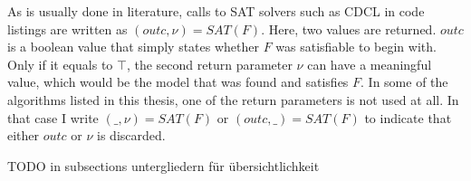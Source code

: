 
As is usually done in literature, calls to SAT solvers such as CDCL in code listings are written as $(outc,\nu) = SAT(F)$. Here, two values are returned. $outc$ is a boolean value that simply states whether $F$ was satisfiable to begin with. Only if it equals to $\top$, the second return parameter $\nu$ can have a meaningful value, which would be the model that was found and satisfies $F$. In some of the algorithms listed in this thesis, one of the return parameters is not used at all. In that case I write $(\_,\nu) = SAT(F)$ or $(outc,\_) = SAT(F)$ to indicate that either $outc$ or $\nu$ is discarded.

TODO in subsections untergliedern für übersichtlichkeit
